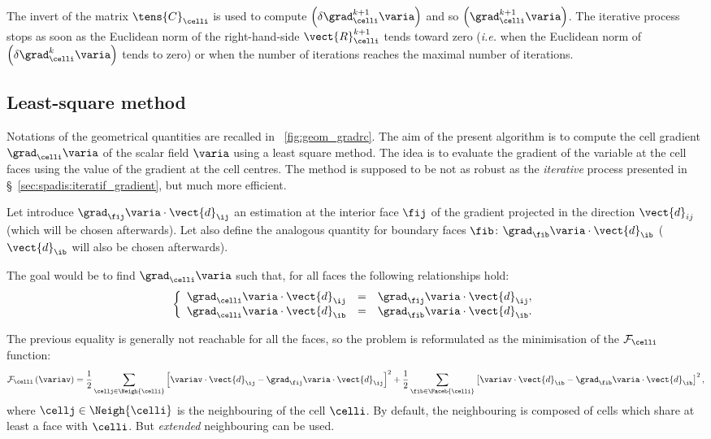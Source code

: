 The invert of the matrix $\tens{C}_{\celli}$ is used to compute $\left( \delta \grad_\celli^{k+1} \varia \right)$ 
and so $\left( \grad^{k+1}_{\celli} \varia \right)$. The iterative process stops as soon as the Euclidean norm of the right-hand-side $\vect{R}^{k+1}_{\celli}$ tends toward zero (\emph{i.e.} when the Euclidean norm
of $\left( \delta \grad^{k}_{\celli} \varia \right)$ tends to zero) or when the number of iterations reaches the maximal number of iterations.


\subsection{Least-square method}\label{sec:spadis:least_square_gradient}
%
Notations of the geometrical quantities are recalled in \figurename~\ref{fig:geom_gradrc}.
The aim of the present algorithm is to compute the cell gradient $\grad_{\celli} \varia $ of the scalar field $\varia$
using a least square method. 
The idea is to evaluate the gradient of the variable at the cell faces using the value of the gradient at the cell centres.
The method is supposed to be not as robust as the \emph{iterative} process presented in \S~\ref{sec:spadis:iteratif_gradient}, 
but much more efficient.

Let introduce $\grad_\fij \varia \cdot \vect{d}_\ij$  an estimation at the interior face $\fij$
of the gradient projected in the direction $\vect{d}_{ij}$ (which will be chosen afterwards).
Let also define the analogous quantity for boundary faces $\fib$: $\grad_\fib \varia \cdot \vect{d}_\ib$
 ($\vect{d}_\ib$ will also be chosen afterwards).

The goal would be to find $\grad_{\celli} \varia $ such that, for all faces
the following relationships hold:
\begin{equation}
\left\{\begin{array}{r c l}
\grad_{\celli} \varia  \cdot \vect{d}_\ij &=& \grad_\fij \varia \cdot \vect{d}_\ij , \\
\grad_{\celli} \varia  \cdot \vect{d}_\ib &=& \grad_\fib \varia \cdot \vect{d}_\ib .
\end{array}\right.
\end{equation}

The previous equality is generally not reachable for all the faces, so the 
problem is reformulated as the minimisation of the $\mathcal{F}_\celli$ function: 
%
\begin{equation}\label{eq:spadis:gradmc_function}
\mathcal{F}_\celli
\left( \variav \right) =
\dfrac{1}{2}\sum\limits_{\cellj \in \Neigh{\celli}  }\left[
 \variav   \cdot \vect{d}_\ij  -  \grad_{\fij} \varia   \cdot \vect{d}_\ij 
\right]^2+
\dfrac{1}{2}\sum\limits_{ \fib \in \Faceb{\celli}}\left[
 \variav   \cdot \vect{d}_\ib  -  \grad_{\fib} \varia   \cdot \vect{d}_\ib
\right]^2,
\end{equation}
where $\cellj \in \Neigh{\celli} $ is the neighbouring of the cell $\celli$. By default, the neighbouring is composed of
cells which share at least a face with $\celli$. But \emph{extended} neighbouring can be used. 


